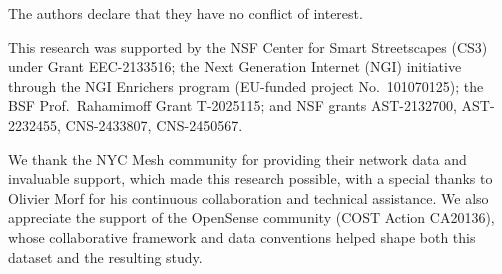 \documentclass[manuscript]{copernicus}
\begin{document}
\competinginterests
{
The authors declare that they have no conflict of interest.
} 

\begin{acknowledgements}
This research was supported by the NSF Center for Smart Streetscapes (CS3) under Grant EEC-2133516; the Next Generation Internet (NGI) initiative through the NGI Enrichers program (EU-funded project No.\ 101070125); the BSF Prof.\ Rahamimoff Grant T-2025115; and NSF grants AST-2132700, AST-2232455, CNS-2433807, CNS-2450567.

We thank the NYC Mesh community for providing their network data and invaluable support, which made this research possible, with a special thanks to Olivier Morf for his continuous collaboration and technical assistance. We also appreciate the support of the OpenSense community (COST Action CA20136), whose collaborative framework and data conventions helped shape both this dataset and the resulting study.
\end{acknowledgements}





\end{document}
